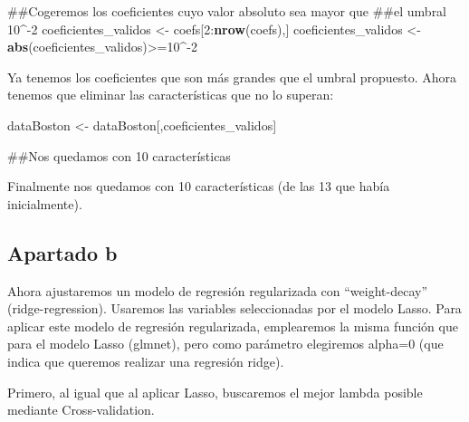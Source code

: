 \documentclass[]{article}
\newenvironment{Shaded}{\begin{snugshade}}{\end{snugshade}}
\newcommand{\KeywordTok}[1]{\textcolor[rgb]{0.13,0.29,0.53}{\textbf{{#1}}}}
\newcommand{\DecValTok}[1]{\textcolor[rgb]{0.00,0.00,0.81}{{#1}}}
\newcommand{\StringTok}[1]{\textcolor[rgb]{0.31,0.60,0.02}{{#1}}}
\newcommand{\NormalTok}[1]{{#1}}
\begin{document}
\begin{Shaded}
\begin{Highlighting}[]
\NormalTok{##Cogeremos los coeficientes cuyo valor absoluto sea mayor que}
\NormalTok{##el umbral 10^-2}
\NormalTok{coeficientes_validos <-}\StringTok{ }\NormalTok{coefs[}\DecValTok{2}\NormalTok{:}\KeywordTok{nrow}\NormalTok{(coefs),]}
\NormalTok{coeficientes_validos <-}\StringTok{ }\KeywordTok{abs}\NormalTok{(coeficientes_validos)>=}\DecValTok{10}\NormalTok{^-}\DecValTok{2}
\end{Highlighting}
\end{Shaded}

Ya tenemos los coeficientes que son más grandes que el umbral propuesto.
Ahora tenemos que eliminar las características que no lo superan:

\begin{Shaded}
\begin{Highlighting}[]
\NormalTok{dataBoston <-}\StringTok{ }\NormalTok{dataBoston[,coeficientes_validos]}

\NormalTok{##Nos quedamos con 10 características}
\end{Highlighting}
\end{Shaded}

Finalmente nos quedamos con 10 características (de las 13 que había
inicialmente).

\subsection{Apartado b}\label{apartado-b}

Ahora ajustaremos un modelo de regresión regularizada con
``weight-decay'' (ridge-regression). Usaremos las variables
seleccionadas por el modelo Lasso. Para aplicar este modelo de regresión
regularizada, emplearemos la misma función que para el modelo Lasso
(glmnet), pero como parámetro elegiremos alpha=0 (que indica que
queremos realizar una regresión ridge).

Primero, al igual que al aplicar Lasso, buscaremos el mejor lambda
posible mediante Cross-validation.
\end{document}
